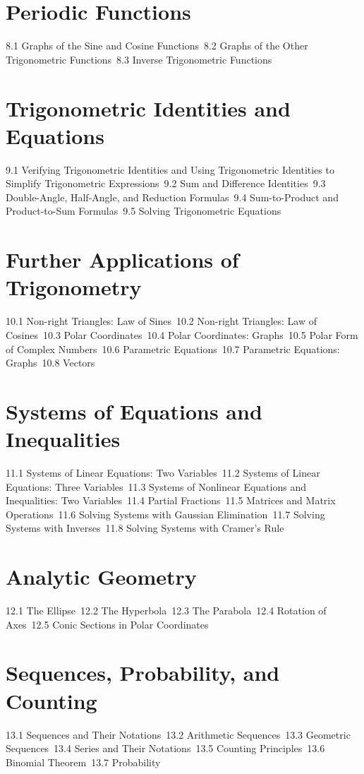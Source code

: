 \section{Periodic Functions}
8.1 Graphs of the Sine and Cosine Functions\
8.2 Graphs of the Other Trigonometric Functions\
8.3 Inverse Trigonometric Functions\
\section{Trigonometric Identities and Equations}
9.1 Verifying Trigonometric Identities and Using Trigonometric Identities to Simplify Trigonometric Expressions\
9.2 Sum and Difference Identities\
9.3 Double-Angle, Half-Angle, and Reduction Formulas\
9.4 Sum-to-Product and Product-to-Sum Formulas\
9.5 Solving Trigonometric Equations\
\section{Further Applications of Trigonometry}
10.1 Non-right Triangles: Law of Sines\
10.2 Non-right Triangles: Law of Cosines\
10.3 Polar Coordinates\
10.4 Polar Coordinates: Graphs\
10.5 Polar Form of Complex Numbers\
10.6 Parametric Equations\
10.7 Parametric Equations: Graphs\
10.8 Vectors\
\section{Systems of Equations and Inequalities}
11.1 Systems of Linear Equations: Two Variables\
11.2 Systems of Linear Equations: Three Variables\
11.3 Systems of Nonlinear Equations and Inequalities: Two Variables\
11.4 Partial Fractions\
11.5 Matrices and Matrix Operations\
11.6 Solving Systems with Gaussian Elimination\
11.7 Solving Systems with Inverses\
11.8 Solving Systems with Cramer's Rule\
\section{Analytic Geometry}
12.1 The Ellipse\
12.2 The Hyperbola\
12.3 The Parabola\
12.4 Rotation of Axes\
12.5 Conic Sections in Polar Coordinates\
\section{Sequences, Probability, and Counting}
13.1 Sequences and Their Notations\
13.2 Arithmetic Sequences\
13.3 Geometric Sequences\
13.4 Series and Their Notations\
13.5 Counting Principles\
13.6 Binomial Theorem\
13.7 Probability\
